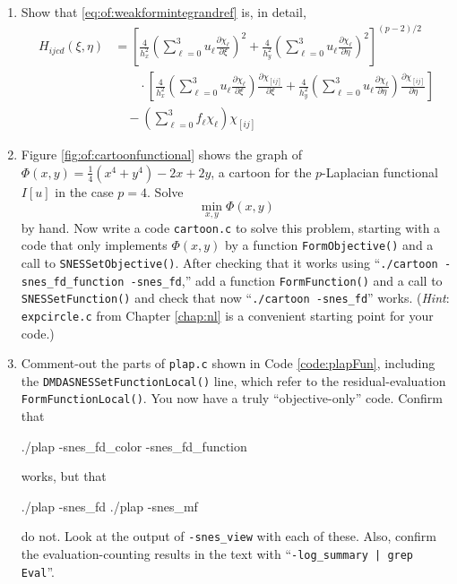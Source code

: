 \begin{enumerate}
\item \label{exer:of:weakformintegrand}  Show that \eqref{eq:of:weakformintegrandref} is, in detail,
\begin{align*}
H_{ijcd}(\xi,\eta) &= \left[\frac{4}{h_x^2} \left(\sum_{\ell=0}^3 u_\ell \frac{\partial\chi_\ell}{\partial \xi}\right)^2 + \frac{4}{h_y^2} \left(\sum_{\ell=0}^3 u_\ell \frac{\partial\chi_\ell}{\partial \eta}\right)^2\right]^{(p-2)/2} \\
  &\qquad \cdot \left[\frac{4}{h_x^2} \left(\sum_{\ell=0}^3 u_\ell \frac{\partial\chi_\ell}{\partial \xi}\right) \frac{\partial\chi_{[ij]}}{\partial \xi} + \frac{4}{h_y^2} \left(\sum_{\ell=0}^3 u_\ell \frac{\partial\chi_\ell}{\partial \eta}\right) \frac{\partial\chi_{[ij]}}{\partial \eta}\right] \\
  &\quad - \left(\sum_{\ell=0}^3 f_\ell \chi_\ell\right) \chi_{[ij]}
\end{align*}

\item Figure \ref{fig:of:cartoonfunctional} shows the graph of $\Phi(x,y)=\tfrac{1}{4}(x^4+y^4) - 2x + 2y$, a cartoon for the $p$-Laplacian functional $I[u]$ in the case $p=4$.  Solve
    $$\min_{x,y} \Phi(x,y)$$
by hand.  Now write a \PETSc code \texttt{cartoon.c} to solve this problem, starting with a code that only implements $\Phi(x,y)$ by a function \texttt{FormObjective()} and a call to \texttt{SNESSetObjective()}.  After checking that it works using ``\texttt{./cartoon -snes\_fd\_function -snes\_fd},'' add a function \texttt{FormFunction()} and a call to \texttt{SNESSetFunction()} and check that now ``\texttt{./cartoon -snes\_fd}'' works.  (\emph{Hint}:  \texttt{expcircle.c} from Chapter \ref{chap:nl} is a convenient starting point for your code.)

\item \label{exer:of:commentoutresidual}  Comment-out the parts of \texttt{plap.c} shown in Code \ref{code:plapFun}, including the \texttt{DMDASNESSetFunctionLocal()} line, which refer to the residual-evaluation \texttt{FormFunctionLocal()}.  You now have a truly ``objective-only'' code.  Confirm that
\begin{cline}
./plap -snes_fd_color -snes_fd_function
\end{cline}
works, but that
\begin{cline}
./plap -snes_fd
./plap -snes_mf
\end{cline}
do not.  Look at the output of \texttt{-snes\_view} with each of these.  Also, confirm the evaluation-counting results in the text with ``\texttt{-log\_summary | grep Eval}''.


\end{enumerate}
